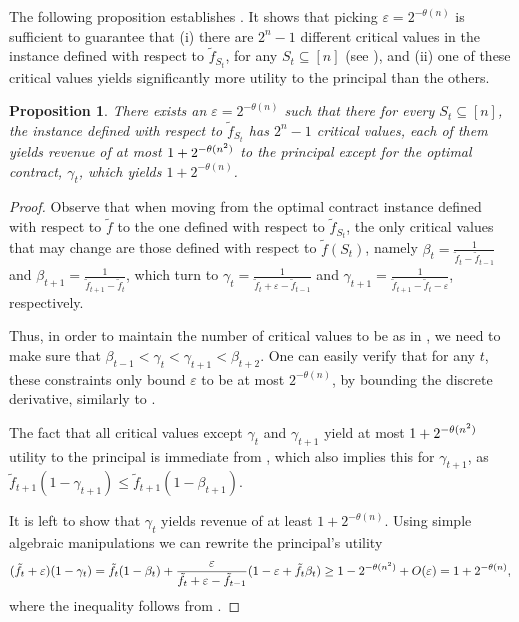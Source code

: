 \documentclass[11pt]{article}
\newtheorem{proposition}{Proposition}
\newcommand{\eps}{\varepsilon}
\newcommand{\tf}{\tilde{f}}
\begin{document}
The following proposition establishes . It shows that picking $\eps = 2^{-\theta(n)}$ is sufficient to guarantee that (i) there are $2^n-1$ different critical values in the instance defined with respect to $\tf_{S_t}$, for any $S_t \subseteq [n]$ (see ), and (ii) one of these critical values yields significantly more utility to the principal than the others.

\begin{proposition}\label{prop:ftlUniqOpt}
    There exists an $\eps = 2^{-\theta(n)}$ such that there for every $S_t \subseteq [n]$, the instance defined with respect to $\tf_{S_t}$ has $2^n-1$ critical values, each of them yields revenue of at most $1 + 2^{-\theta(n^2)}$ to the principal except for the optimal contract, $\gamma_t$, which yields $1+2^{-\theta(n)}$.
\end{proposition}
\begin{proof}
    Observe that when moving from the optimal contract instance defined with respect to $\tf$ to the one defined with respect to $\tf_{S_t}$, the only critical values that may change are those defined with respect to $\tf(S_t)$, namely $\beta_{t} = \frac{1}{\tf_{t} - \tf_{t-1}}$ and $\beta_{t+1} = \frac{1}{\tf_{t+1} - \tf_t}$, which turn to $\gamma_{t} = \frac{1}{\tf_{t} + \eps - \tf_{t-1}}$ and $\gamma_{t+1} = \frac{1}{\tf_{t+1} - \tf_t - \eps}$, respectively.

    Thus, in order to maintain the number of critical values to be as in , we need to make sure that $\beta_{t-1} < \gamma_t < \gamma_{t+1} < \beta_{t+2}$.
    One can easily verify that for any $t$, these constraints only bound $\eps$ to be at most $2^{-\theta(n)}$, by bounding the discrete derivative, similarly to .

    The fact that all critical values except $\gamma_t$ and $\gamma_{t+1}$ yield at most $1 + 2^{-\theta(n^2)}$ utility to the principal is immediate from , which also implies this for $\gamma_{t+1}$, as $\tf_{t+1}(1-\gamma_{t+1}) \le \tf_{t+1}(1-\beta_{t+1})$.
    
    It is left to show that $\gamma_t$ yields revenue of at least $1 + 2^{-\theta(n)}$.
    Using simple algebraic manipulations we can rewrite the principal's utility
    $$
    (\tf_t+ \eps)(1-\gamma_t) = 
    \tf_t(1-\beta_t) + \frac{\eps}{\tf_t + \eps - \tf_{t-1}}(1 - \eps + \tf_t \beta_t)
    \ge 
    1-2^{-\tn} + O(\eps)
    =
    1+2^{-\theta(n)},
    $$
    where the inequality follows from . 
\end{proof}
\end{document}
